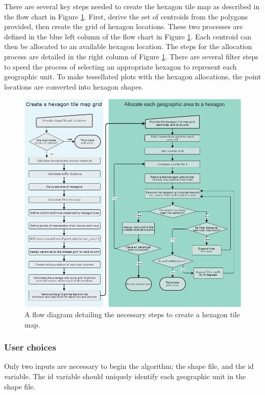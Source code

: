 There are several key steps needed to create the hexagon tile map as
described in the flow chart in Figure \ref{fig:sugarbag_flow}. First,
derive the set of centroids from the polygons provided, then create the
grid of hexagon locations. These two processes are defined in the blue
left column of the flow chart in Figure \ref{fig:sugarbag_flow}. Each
centroid can then be allocated to an available hexagon location. The
steps for the allocation process are detailed in the right column of
Figure \ref{fig:sugarbag_flow}. There are several filter steps to speed
the process of selecting an appropriate hexagon to represent each
geographic unit. To make tessellated plots with the hexagon allocations,
the point locations are converted into hexagon shapes.

\begin{figure}
\includegraphics[width=14cm]{figs/sugarbag flow.png}
\caption{\label{fig:sugarbag_flow}A flow diagram detailing the necessary steps to create a hexagon tile map.}
\end{figure}

\hypertarget{user-choices}{%
\subsubsection{User choices}\label{user-choices}}

Only two inputs are necessary to begin the algorithm; the shape file,
and the id variable. The id variable should uniquely identify each
geographic unit in the shape file.

